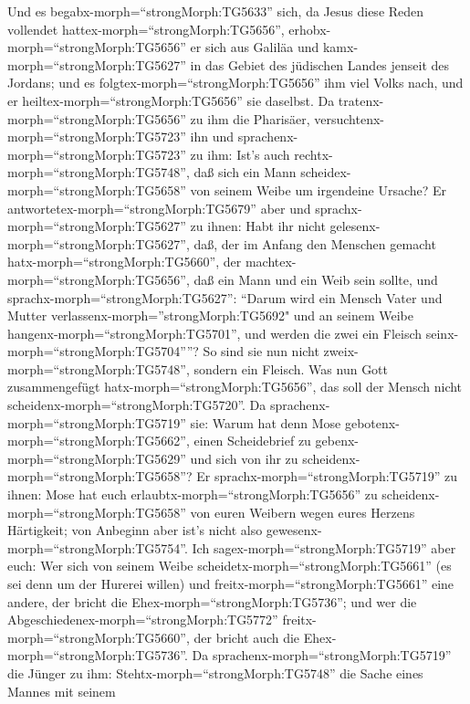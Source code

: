  Und es begabx-morph=``strongMorph:TG5633'' sich, da Jesus
diese Reden vollendet hattex-morph=``strongMorph:TG5656'',
erhobx-morph=``strongMorph:TG5656'' er sich aus Galiläa und
kamx-morph=``strongMorph:TG5627'' in das Gebiet des jüdischen Landes
jenseit des Jordans;  und es
folgtex-morph=``strongMorph:TG5656'' ihm viel Volks nach, und er
heiltex-morph=``strongMorph:TG5656'' sie daselbst.  Da
tratenx-morph=``strongMorph:TG5656'' zu ihm die Pharisäer,
versuchtenx-morph=``strongMorph:TG5723'' ihn und
sprachenx-morph=``strongMorph:TG5723'' zu ihm: Ist's auch
rechtx-morph=``strongMorph:TG5748'', daß sich ein Mann
scheidex-morph=``strongMorph:TG5658'' von seinem Weibe um irgendeine
Ursache?  Er antwortetex-morph=``strongMorph:TG5679'' aber
und sprachx-morph=``strongMorph:TG5627'' zu ihnen: Habt ihr nicht
gelesenx-morph=``strongMorph:TG5627'', daß, der im Anfang den Menschen
gemacht hatx-morph=``strongMorph:TG5660'', der
machtex-morph=``strongMorph:TG5656'', daß ein Mann und ein Weib sein
sollte,  und sprachx-morph=``strongMorph:TG5627'': ``Darum
wird ein Mensch Vater und Mutter verlassenx-morph=''strongMorph:TG5692"
und an seinem Weibe hangenx-morph=``strongMorph:TG5701'', und werden die
zwei ein Fleisch seinx-morph=``strongMorph:TG5704''''?  So
sind sie nun nicht zweix-morph=``strongMorph:TG5748'', sondern ein
Fleisch. Was nun Gott zusammengefügt hatx-morph=``strongMorph:TG5656'',
das soll der Mensch nicht scheidenx-morph=``strongMorph:TG5720''.
 Da sprachenx-morph=``strongMorph:TG5719'' sie: Warum hat
denn Mose gebotenx-morph=``strongMorph:TG5662'', einen Scheidebrief zu
gebenx-morph=``strongMorph:TG5629'' und sich von ihr zu
scheidenx-morph=``strongMorph:TG5658''?  Er
sprachx-morph=``strongMorph:TG5719'' zu ihnen: Mose hat euch
erlaubtx-morph=``strongMorph:TG5656'' zu
scheidenx-morph=``strongMorph:TG5658'' von euren Weibern wegen eures
Herzens Härtigkeit; von Anbeginn aber ist's nicht also
gewesenx-morph=``strongMorph:TG5754''.  Ich
sagex-morph=``strongMorph:TG5719'' aber euch: Wer sich von seinem Weibe
scheidetx-morph=``strongMorph:TG5661'' (es sei denn um der Hurerei
willen) und freitx-morph=``strongMorph:TG5661'' eine andere, der bricht
die Ehex-morph=``strongMorph:TG5736''; und wer die
Abgeschiedenex-morph=``strongMorph:TG5772''
freitx-morph=``strongMorph:TG5660'', der bricht auch die
Ehex-morph=``strongMorph:TG5736''.  Da
sprachenx-morph=``strongMorph:TG5719'' die Jünger zu ihm:
Stehtx-morph=``strongMorph:TG5748'' die Sache eines Mannes mit seinem
